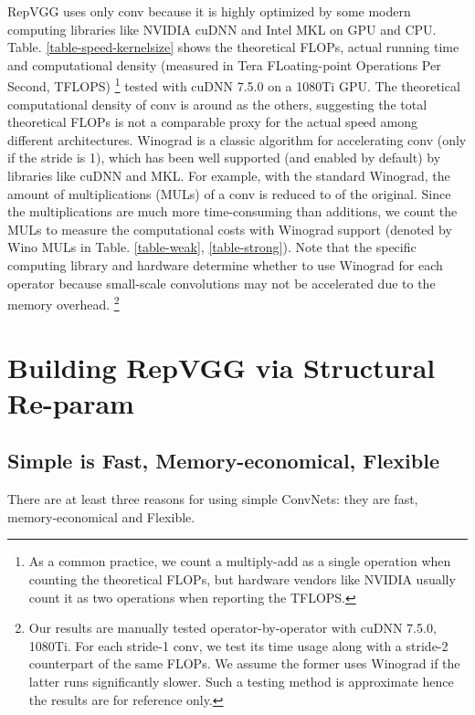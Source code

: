 \documentclass[final]{cvpr}
\begin{document}
RepVGG uses only  conv because it is highly optimized by some modern computing libraries like NVIDIA cuDNN \cite{chetlur2014cudnn} and Intel MKL \cite{intel-mkl} on GPU and CPU. Table. \ref{table-speed-kernelsize} shows the theoretical FLOPs, actual running time and computational density (measured in Tera FLoating-point Operations Per Second, TFLOPS) \footnote{As a common practice, we count a multiply-add as a single operation when counting the theoretical FLOPs, but hardware vendors like NVIDIA usually count it as two operations when reporting the TFLOPS.} tested with cuDNN 7.5.0 on a 1080Ti GPU. The theoretical computational density of  conv is around  as the others, suggesting the total theoretical FLOPs is not a comparable proxy for the actual speed among different architectures. Winograd \cite{winograd} is a classic algorithm for accelerating  conv (only if the stride is 1), which has been well supported (and enabled by default) by libraries like cuDNN and MKL. For example, with the standard  Winograd, the amount of multiplications (MULs) of a  conv is reduced to  of the original. Since the multiplications are much more time-consuming than additions, we count the MULs to measure the computational costs with Winograd support (denoted by Wino MULs in Table. \ref{table-weak}, \ref{table-strong}). Note that the specific computing library and hardware determine whether to use Winograd for each operator because small-scale convolutions may not be accelerated due to the memory overhead. \footnote{Our results are manually tested operator-by-operator with cuDNN 7.5.0, 1080Ti. For each stride-1  conv, we test its time usage along with a stride-2 counterpart of the same FLOPs. We assume the former uses  Winograd if the latter runs significantly slower. Such a testing method is approximate hence the results are for reference only.}


\section{Building RepVGG via Structural Re-param}

\subsection{Simple is Fast, Memory-economical, Flexible}

There are at least three reasons for using simple ConvNets: they are fast, memory-economical and Flexible.
\end{document}
